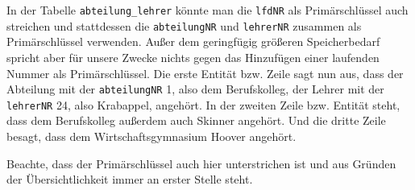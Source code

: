 In der Tabelle \lstinline!abteilung_lehrer! könnte man die \lstinline!lfdNR! als Primärschlüssel auch streichen und stattdessen die \lstinline!abteilungNR! und \lstinline!lehrerNR! zusammen als Primärschlüssel verwenden. Außer dem geringfügig größeren Speicherbedarf spricht aber für unsere Zwecke nichts gegen das Hinzufügen einer laufenden Nummer als Primärschlüssel. Die erste Entität bzw. Zeile sagt nun aus, dass der Abteilung mit der \lstinline!abteilungNR! 1, also dem Berufskolleg, der Lehrer mit der \lstinline!lehrerNR! 24, also Krabappel, angehört. In der zweiten Zeile bzw. Entität steht, dass dem Berufskolleg außerdem auch Skinner angehört. Und die dritte Zeile besagt, dass dem Wirtschaftsgymnasium Hoover angehört.

Beachte, dass der Primärschlüssel auch hier unterstrichen ist und aus Gründen der Übersichtlichkeit immer an erster Stelle steht.
\begin{Exercise}[title=Erstelle zu den ERMs aus Aufgabe \ref{ERMErstellen1} passende Tabellen., label=TabelleErstellen1]

\end{Exercise}
